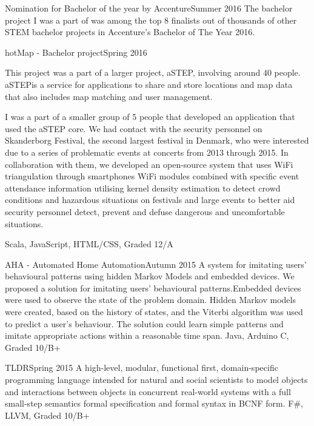 %
%
%


\begin{projects}
	\project
	{Nomination for Bachelor of the year by Accenture}{Summer 2016}
	{}
	{The bachelor project I was a part of was among the top 8 finalists out of thousands of other STEM bachelor projects in Accenture’s Bachelor of The Year 2016.}
	{}
				
	\project
	{hotMap - Bachelor project}{Spring 2016}
	{}
	{This project was a part of a larger project, aSTEP, involving around 40 people. aSTEPis a service for applications to share and store locations and map data that also includes map matching and user management.
	
	I was a part of a smaller group of 5 people that developed an application that used the aSTEP core. We had contact with the security personnel on Skanderborg Festival, the second largest festival in Denmark, who were interested due to a series of problematic events at concerts from 2013 through 2015. In collaboration with them, we developed an open-source system that uses WiFi triangulation through smartphones WiFi modules combined with specific event attendance information utilising kernel density estimation to detect crowd conditions and hazardous situations on festivals and large events to better aid security personnel detect, prevent and defuse dangerous and uncomfortable situations.}
	{Scala, JavaScript, HTML/CSS, Graded 12/A}
	
	\project
	{AHA - Automated Home Automation}{Autumn 2015}
	{}
	{A system for imitating users’ behavioural patterns using hidden Markov Models and embedded devices. We proposed a solution for imitating users’ behavioural patterns.Embedded  devices  were  used  to  observe  the  state  of  the  problem  domain.  Hidden Markov models were created, based on the history of states, and the Viterbi algorithm was used to predict a user’s behaviour. The solution could learn simple patterns and imitate appropriate actions within a reasonable time span.}
	{Java, Arduino C, Graded 10/B+}
	
	\project
	{TLDR}{Spring 2015}
	{}
	{A high-level, modular, functional first, domain-specific programming language intended for natural and social scientists to model objects and interactions between objects in concurrent real-world systems with a full small-step semantics formal specification and formal syntax in BCNF form.}
	{F\#, LLVM, Graded 10/B+}
	

\end{projects}
